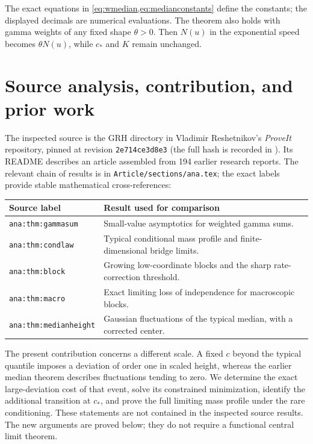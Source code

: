 \documentclass[11pt,letterpaper]{article}
\numberwithin{equation}{section}
\theoremstyle{definition}
\theoremstyle{remark}
\begin{document}
The exact equations in \cref{eq:wmedian,eq:medianconstants} define the constants; the displayed decimals are numerical evaluations. The theorem also holds with gamma weights of any fixed shape $\theta>0$. Then $N(u)$ in the exponential speed becomes $\theta N(u)$, while $c_*$ and $K$ remain unchanged.

\section{Source analysis, contribution, and prior work}\label{sec:source}

The inspected source is the GRH directory in Vladimir Reshetnikov's \emph{ProveIt} repository, pinned at revision \texttt{2e714ce3d8e3} (the full hash is recorded in \cite{ProveIt}). Its README describes an article assembled from 194 earlier research reports. The relevant chain of results is in \texttt{Article/sections/ana.tex}; the exact labels provide stable mathematical cross-references:
\begin{center}
\begin{tabular}{@{}p{}p{}@{}}
\toprule
Source label & Result used for comparison \\
\midrule
\texttt{ana:thm:gammasum} & Small-value asymptotics for weighted gamma sums. \\
\texttt{ana:thm:condlaw} & Typical conditional mass profile and finite-dimensional bridge limits. \\
\texttt{ana:thm:block} & Growing low-coordinate blocks and the sharp rate-correction threshold. \\
\texttt{ana:thm:macro} & Exact limiting loss of independence for macroscopic blocks. \\
\texttt{ana:thm:medianheight} & Gaussian fluctuations of the typical median, with a corrected center. \\
\bottomrule
\end{tabular}
\end{center}

The present contribution concerns a different scale. A fixed $c$ beyond the typical quantile imposes a deviation of order one in scaled height, whereas the earlier median theorem describes fluctuations tending to zero. We determine the exact large-deviation cost of that event, solve its constrained minimization, identify the additional transition at $c_*$, and prove the full limiting mass profile under the rare conditioning. These statements are not contained in the inspected source results. The new arguments are proved below; they do not require a functional central limit theorem.
\end{document}
